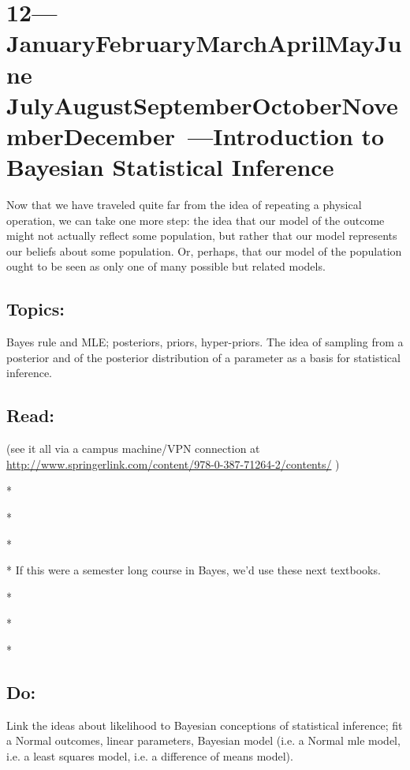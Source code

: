 \documentclass[10pt]{article}
\def\themonth{\ifcase\month\or
  January\or February\or March\or April\or May\or June\or
  July\or August\or September\or October\or November\or December\fi}
\begin{document}
\AdvanceDate[7]
\section{12---\themonth~\the\day---Introduction to Bayesian Statistical Inference}

Now that we have traveled quite far from the idea of repeating a
physical operation, we can take one more step: the idea that our model
of the outcome might not actually reflect some population, but rather
that our model represents our beliefs about some population. Or,
perhaps, that our model of the population ought to be seen as only one
of many possible but related models.

\subsection{Topics:} Bayes rule and MLE; posteriors, priors,
hyper-priors. The idea of sampling from a posterior and of the
posterior distribution of a parameter as a basis for statistical
inference.

\subsection{Read:}

\citealp[Chap 18.1--18.3]{gelman2007dau}

\citealp[Chap 3,7]{lynch2007introduction} (see it all via a campus machine/VPN connection  at \url{http://www.springerlink.com/content/978-0-387-71264-2/contents/} )

*\citealp[Chap 1, 3, 5.2, Appendix 1]{lancaster2004introduction}

*\citealp[Chap 9]{albert2009bayesian}

*\citealp{kruschke2010doing}

* If this were a semester long course in Bayes, we'd use these next
textbooks.

*\citealp{JeffGill2002a}

*\citealp{jackman2009bayesian}

*\citealp{gelmanbda04}


\subsection{Do:} Link the ideas about likelihood to Bayesian
conceptions of statistical inference; fit a Normal outcomes, linear
parameters, Bayesian model (i.e. a Normal mle model, i.e. a least
squares model, i.e. a difference of means model).
\end{document}
